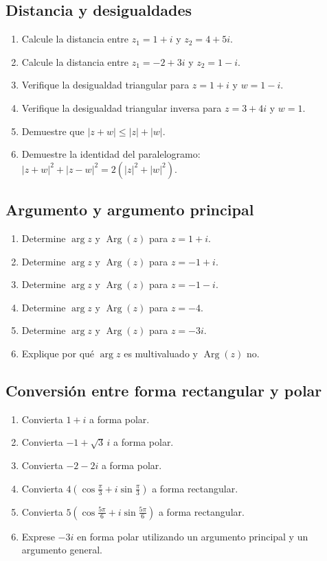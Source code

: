 \documentclass[12pt]{article}
\begin{document}
\subsection*{Distancia y desigualdades}
\begin{enumerate}
\item Calcule la distancia entre $z_1=1+i$ y $z_2=4+5i$.
\item Calcule la distancia entre $z_1=-2+3i$ y $z_2=1-i$.
\item Verifique la desigualdad triangular para $z=1+i$ y $w=1-i$.
\item Verifique la desigualdad triangular inversa para $z=3+4i$ y $w=1$.
\item Demuestre que $|z+w|\le |z|+|w|$.
\item Demuestre la identidad del paralelogramo: $|z+w|^2+|z-w|^2=2(|z|^2+|w|^2)$.
\end{enumerate}

\subsection*{Argumento y argumento principal}
\begin{enumerate}
\item Determine $\arg z$ y $\operatorname{Arg}(z)$ para $z=1+i$.
\item Determine $\arg z$ y $\operatorname{Arg}(z)$ para $z=-1+i$.
\item Determine $\arg z$ y $\operatorname{Arg}(z)$ para $z=-1-i$.
\item Determine $\arg z$ y $\operatorname{Arg}(z)$ para $z=-4$.
\item Determine $\arg z$ y $\operatorname{Arg}(z)$ para $z=-3i$.
\item Explique por qué $\arg z$ es multivaluado y $\operatorname{Arg}(z)$ no.
\end{enumerate}

\subsection*{Conversión entre forma rectangular y polar}
\begin{enumerate}
\item Convierta $1+i$ a forma polar.
\item Convierta $-1+\sqrt3\,i$ a forma polar.
\item Convierta $-2-2i$ a forma polar.
\item Convierta $4\left(\cos\frac{\pi}{3}+i\sin\frac{\pi}{3}\right)$ a forma rectangular.
\item Convierta $5\left(\cos\frac{5\pi}{6}+i\sin\frac{5\pi}{6}\right)$ a forma rectangular.
\item Exprese $-3i$ en forma polar utilizando un argumento principal y un argumento general.
\end{enumerate}
\end{document}
